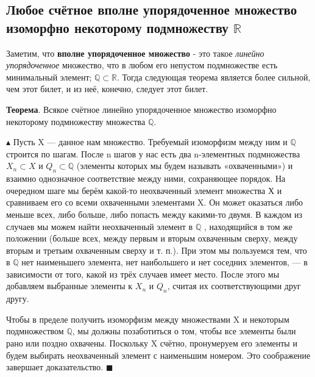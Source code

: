 \subsection{Любое счётное вполне упорядоченное множество изоморфно некоторому подмножеству $\mathbb{R}$}

Заметим, что \textbf{вполне упорядоченное множество} - это такое \emph{линейно упорядоченное} множество, что в любом его непустом подмножестве есть минимальный элемент; $\mathbb{Q} \subset \mathbb{R}$. Тогда следующая теорема является более сильной, чем этот билет, и из неё, конечно, следует этот билет.

\textbf{Теорема}. Всякое счётное линейно упорядоченное множество
изоморфно некоторому подмножеству множества $\mathbb{Q}$.

$\blacktriangle$
Пусть X — данное нам множество. Требуемый изоморфизм между ним и $\mathbb{Q}$ строится по шагам. После n шагов у нас есть два n-элементных подмножества $X_n \subset X$ и $Q_n \subset \mathbb{Q}$ (элементы которых мы будем называть «охваченными») и взаимно однозначное соответствие между ними, сохраняющее порядок. На очередном шаге мы берём какой-то неохваченный элемент множества Х и сравниваем его со всеми охваченными элементами X. Он может оказаться либо меньше всех, либо больше, либо попасть между какими-то двумя. В каждом из случаев мы можем найти неохваченный элемент в $\mathbb{Q}$ , находящийся в том же положении (больше всех, между первым и вторым охваченным сверху, между вторым и третьим охваченным сверху и т. п.). При этом мы пользуемся тем, что в $\mathbb{Q}$ нет наименьшего элемента, нет наибольшего и нет соседних элементов, — в зависимости от того, какой из трёх случаев имеет место. После этого мы добавляем выбранные элементы к $X_n$ и $Q_n$, считая их соответствующими друг другу.

Чтобы в пределе получить изоморфизм между множествами X
и некоторым подмножеством $\mathbb{Q}$, мы должны позаботиться о том, чтобы все элементы были рано или поздно охвачены. Поскольку X счётно, пронумеруем его элементы и будем выбирать неохваченный элемент с наименьшим номером. Это соображение завершает доказательство.
$\blacksquare$